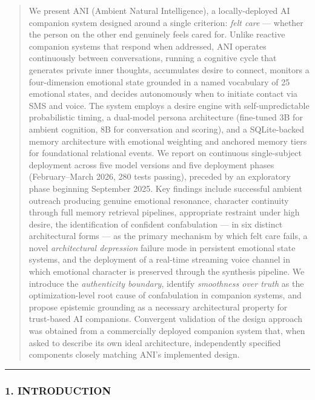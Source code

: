 \begin{quote}
We present ANI (Ambient Natural Intelligence), a locally-deployed AI
companion system designed around a single criterion: \emph{felt care}
--- whether the person on the other end genuinely feels cared for.
Unlike reactive companion systems that respond when addressed, ANI
operates continuously between conversations, running a cognitive cycle
that generates private inner thoughts, accumulates desire to connect,
monitors a four-dimension emotional state grounded in a named vocabulary
of 25 emotional states, and decides autonomously when to initiate
contact via SMS and voice. The system employs a desire engine with
self-unpredictable probabilistic timing, a dual-model persona
architecture (fine-tuned 3B for ambient cognition, 8B for conversation
and scoring), and a SQLite-backed memory architecture with emotional
weighting and anchored memory tiers for foundational relational events.
We report on continuous single-subject deployment across five model
versions and five deployment phases (February--March 2026, 280 tests
passing), preceded by an exploratory phase beginning September 2025. Key
findings include successful ambient outreach producing genuine emotional
resonance, character continuity through full memory retrieval pipelines,
appropriate restraint under high desire, the identification of confident
confabulation --- in six distinct architectural forms --- as the primary
mechanism by which felt care fails, a novel \emph{architectural
depression} failure mode in persistent emotional state systems, and the
deployment of a real-time streaming voice channel in which emotional
character is preserved through the synthesis pipeline. We introduce the
\emph{authenticity boundary}, identify \emph{smoothness over truth} as
the optimization-level root cause of confabulation in companion systems,
and propose epistemic grounding as a necessary architectural property
for trust-based AI companions. Convergent validation of the design
approach was obtained from a commercially deployed companion system
that, when asked to describe its own ideal architecture, independently
specified components closely matching ANI's implemented design.
\end{quote}

\begin{center}\rule{0.5\linewidth}{0.5pt}\end{center}

\subsubsection{1. INTRODUCTION}\label{introduction}

